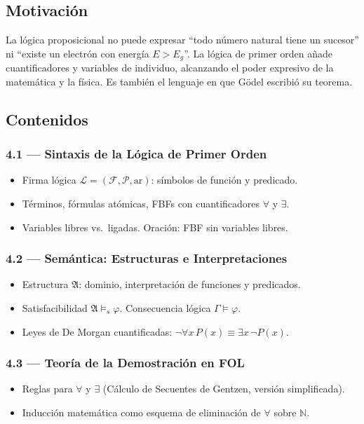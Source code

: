\documentclass[11pt, letterpaper]{article}
\begin{document}
\subsection*{Motivaci\'on}
La l\'ogica proposicional no puede expresar ``todo n\'umero natural tiene un sucesor'' ni ``existe un electr\'on con energ\'ia $E>E_g$''. La l\'ogica de primer orden a\~nade cuantificadores y variables de individuo, alcanzando el poder expresivo de la matem\'atica y la f\'isica. Es tambi\'en el lenguaje en que G\"odel escribi\'o su teorema.

\subsection{Contenidos}

\subsubsection{4.1 --- Sintaxis de la L\'ogica de Primer Orden}
\begin{itemize}
  \item Firma l\'ogica $\mathcal{L}=(\mathcal{F},\mathcal{P},\text{ar})$: s\'imbolos de funci\'on y predicado.
  \item T\'erminos, f\'ormulas at\'omicas, FBFs con cuantificadores $\forall$ y $\exists$.
  \item Variables libres vs.\ ligadas. Oraci\'on: FBF sin variables libres.
\end{itemize}

\subsubsection{4.2 --- Sem\'antica: Estructuras e Interpretaciones}
\begin{itemize}
  \item Estructura $\mathfrak{A}$: dominio, interpretaci\'on de funciones y predicados.
  \item Satisfacibilidad $\mathfrak{A}\models_s\varphi$. Consecuencia l\'ogica $\Gamma\models\varphi$.
  \item Leyes de De Morgan cuantificadas: $\neg\forall x\,P(x)\equiv\exists x\,\neg P(x)$.
\end{itemize}

\subsubsection{4.3 --- Teor\'ia de la Demostraci\'on en FOL}
\begin{itemize}
  \item Reglas para $\forall$ y $\exists$ (C\'alculo de Secuentes de Gentzen, versi\'on simplificada).
  \item Inducci\'on matem\'atica como esquema de eliminaci\'on de $\forall$ sobre $\mathbb{N}$.
\end{itemize}
\end{document}
